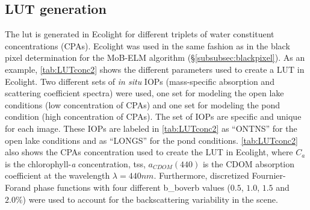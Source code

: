 \subsection{LUT generation}
\label{subsec:LUTgen}
The \gls{lut} is generated in Ecolight \citep{MobleyHE} for different triplets of water constituent concentrations (CPAs). Ecolight was used in the same fashion as in the black pixel determination for the MoB-ELM algorithm (\S\ref{subsubsec:blackpixel}). As an example, \autoref{tab:LUTconc2} shows the different parameters used to create a LUT in Ecolight. Two different sets of {\it in situ} IOPs (mass-specific absorption and scattering coefficient spectra) were used, one set for modeling the open lake conditions (low concentration of CPAs) and one set for modeling the pond condition (high concentration of CPAs). The set of IOPs are specific and unique for each image. These IOPs are labeled in \autoref{tab:LUTconc2} as ``ONTNS'' for the open lake conditions and as ``LONGS'' for the pond conditions. \autoref{tab:LUTconc2} also shows the CPAs concentration used to create the LUT in Ecolight, where $C_a$ is the chlorophyll-{\it a} concentration, \acrfull{tss}, $a_{CDOM}(440)$ is the CDOM absorption coefficient at the wavelength $\lambda=440nm$. Furthermore, discretized Fournier-Forand phase functions with four different \acrfull{b_boverb} values ($0.5$, $1.0$, $1.5$ and $2.0\%$) were used to account for the backscattering variability in the scene.


